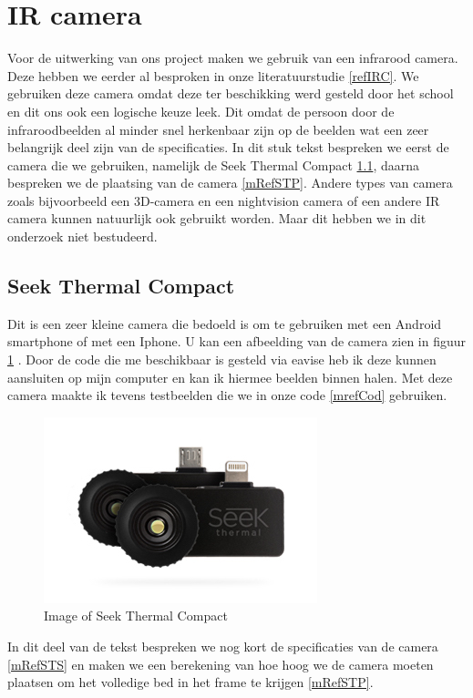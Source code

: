 \section{IR camera}
\label{MRefIRC}
Voor de uitwerking van ons project maken we gebruik van een infrarood camera. Deze hebben we eerder al besproken in onze literatuurstudie \ref{refIRC}. We gebruiken deze camera omdat deze ter beschikking werd gesteld door het school en dit ons ook een logische keuze leek. Dit omdat de persoon door de infraroodbeelden al minder snel herkenbaar zijn op de beelden wat een zeer belangrijk deel zijn van de specificaties. In dit stuk tekst bespreken we eerst de camera die we gebruiken, namelijk de Seek Thermal Compact \ref{mRefSTh}, daarna bespreken we de plaatsing van de camera \ref{mRefSTP}. Andere types van camera zoals bijvoorbeeld een 3D-camera en een nightvision camera of een andere IR camera kunnen natuurlijk ook gebruikt worden. Maar dit hebben we in dit onderzoek niet bestudeerd.

\subsection{Seek Thermal Compact}
\label{mRefSTh}
 Dit is een zeer kleine camera die bedoeld is om te gebruiken met een Android smartphone of met een Iphone. U kan een afbeelding van de camera zien in figuur \ref{imgSTC} \cite{bibImgSTC}. Door de code die me beschikbaar is gesteld via eavise \cite{bibSTC} heb ik deze kunnen aansluiten op mijn computer en kan ik hiermee beelden binnen halen. Met deze camera maakte ik tevens testbeelden die we in onze code \ref{mrefCod} gebruiken.
\begin{figure}[h]
	\includegraphics[scale=0.75]{SeekThermalCompac}
	\caption{Image of Seek Thermal Compact}
	\label{imgSTC}
\end{figure}
In dit deel van de tekst bespreken we nog kort de specificaties van de camera \ref{mRefSTS} en maken we een berekening van hoe hoog we de camera moeten plaatsen om het volledige bed in het frame te krijgen \ref{mRefSTP}.

